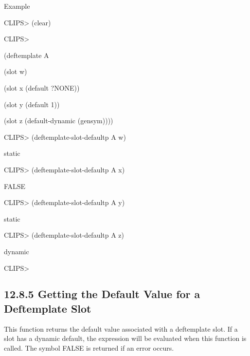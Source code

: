 \documentclass[letterpaper,10pt,english]{sphinxmanual}
\begin{document}

\begin{sphinxVerbatim}[commandchars=\\\{\}]
  
\end{sphinxVerbatim}

Example

CLIPS\textgreater{} (clear)

CLIPS\textgreater{}

(deftemplate A

(slot w)

(slot x (default ?NONE))

(slot y (default 1))

(slot z (default-dynamic (gensym))))

CLIPS\textgreater{} (deftemplate-slot-defaultp A w)

static

CLIPS\textgreater{} (deftemplate-slot-defaultp A x)

FALSE

CLIPS\textgreater{} (deftemplate-slot-defaultp A y)

static

CLIPS\textgreater{} (deftemplate-slot-defaultp A z)

dynamic

CLIPS\textgreater{}


\subsection{12.8.5 Getting the Default Value for a Deftemplate Slot}
\label{\detokenize{actions:getting-the-default-value-for-a-deftemplate-slot}}
This function returns the default value associated with a deftemplate
slot. If a slot has a dynamic default, the expression will be evaluated
when this function is called. The symbol FALSE is returned if an error
occurs.


\begin{sphinxVerbatim}[commandchars=\\\{\}]
  
\end{sphinxVerbatim}
\end{document}

